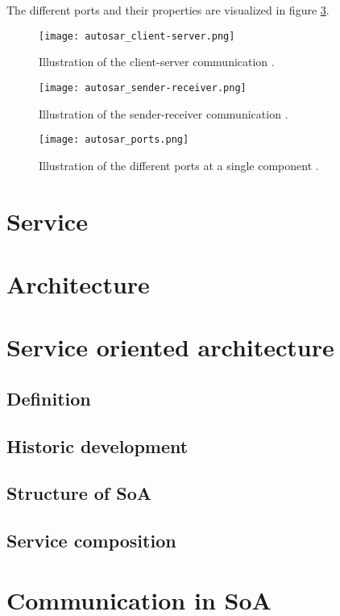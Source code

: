 The different ports and their properties are visualized in figure \ref{fig:autosar_ports}. 

\begin{figure}[ht]
\centering
\texttt{[image: autosar\_client-server.png]}
\caption{Illustration of the client-server communication \cite{autosar_intro}.}
\label{fig:autosar_client-server}
\end{figure}

\begin{figure}[ht]
\centering
\texttt{[image: autosar\_sender-receiver.png]}
\caption{Illustration of the sender-receiver communication \cite{autosar_intro}.}
\label{fig:autosar_sender-receiver}
\end{figure}

\begin{figure}[ht]
\centering
\texttt{[image: autosar\_ports.png]}
\caption{Illustration of the different ports at a single component \cite{autosar_intro}.}
\label{fig:autosar_ports}
\end{figure}

\section{Service}

\section{Architecture}

\section{Service oriented architecture}
\subsection{Definition}
\subsection{Historic development}
\subsection{Structure of SoA}
\subsection{Service composition}

\section{Communication in SoA}

